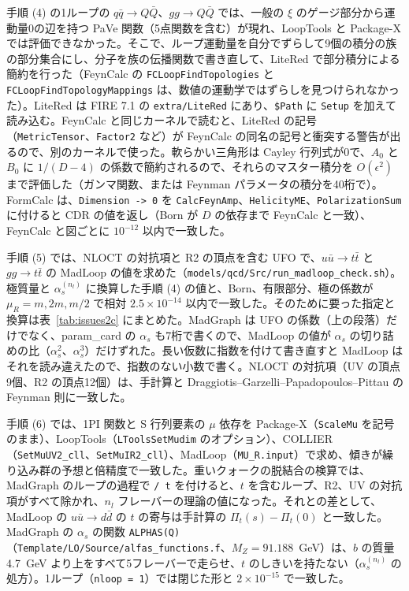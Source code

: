 \documentclass[a4paper,10pt]{ltjsarticle}
\begin{document}
手順 (4) の1ループの $q\bar q\to Q\bar Q$、$gg\to Q\bar Q$ では、一般の $\xi$ のゲージ部分から運動量0の辺を持つ PaVe 関数（5点関数を含む）が現れ、LoopTools と Package-X では評価できなかった。そこで、ループ運動量を自分でずらして9個の積分の族の部分集合にし、分子を族の伝播関数で書き直して、LiteRed で部分積分による簡約を行った（FeynCalc の \texttt{FCLoopFindTopologies} と \texttt{FCLoopFindTopologyMappings} は、数値の運動学ではずらしを見つけられなかった）。LiteRed は FIRE 7.1 の \texttt{extra/LiteRed} にあり、\texttt{\$Path} に \texttt{Setup} を加えて読み込む。FeynCalc と同じカーネルで読むと、LiteRed の記号（\texttt{MetricTensor}、\texttt{Factor2} など）が FeynCalc の同名の記号と衝突する警告が出るので、別のカーネルで使った。軟らかい三角形は Cayley 行列式が0で、$A_0$ と $B_0$ に $1/(D-4)$ の係数で簡約されるので、それらのマスター積分を $O(\epsilon^2)$ まで評価した（ガンマ関数、または Feynman パラメータの積分を40桁で）。FormCalc は、\texttt{Dimension -> 0} を \texttt{CalcFeynAmp}、\texttt{HelicityME}、\texttt{PolarizationSum} に付けると CDR の値を返し（Born が $D$ の依存まで FeynCalc と一致）、FeynCalc と図ごとに $10^{-12}$ 以内で一致した。

手順 (5) では、NLOCT の対抗項と R2 の頂点を含む UFO で、$u\bar u\to t\bar t$ と $gg\to t\bar t$ の MadLoop の値を求めた（\nolinkurl{models/qcd/Src/run_madloop_check.sh}）。極質量と $\alpha_s^{(n_l)}$ に換算した手順 (4) の値と、Born、有限部分、極の係数が $\mu_R=m,2m,m/2$ で相対 $2.5\times10^{-14}$ 以内で一致した。そのために要った指定と換算は表~\ref{tab:issues2c} にまとめた。MadGraph は UFO の係数（上の段落）だけでなく、param\_card の $\alpha_s$ も7桁で書くので、MadLoop の値が $\alpha_s$ の切り詰めの比（$\alpha_s^2$、$\alpha_s^3$）だけずれた。長い仮数に指数を付けて書き直すと MadLoop はそれを読み違えたので、指数のない小数で書く。NLOCT の対抗項（UV の頂点9個、R2 の頂点12個）は、手計算と Draggiotis--Garzelli--Papadopoulos--Pittau の Feynman 則に一致した。

手順 (6) では、1PI 関数と S 行列要素の $\mu$ 依存を Package-X（\texttt{ScaleMu} を記号のまま）、LoopTools（\texttt{LToolsSetMudim} のオプション）、COLLIER（\texttt{SetMuUV2\_cll}、\texttt{SetMuIR2\_cll}）、MadLoop（\texttt{MU\_R.input}）で求め、傾きが繰り込み群の予想と倍精度で一致した。重いクォークの脱結合の検算では、MadGraph のループの過程で \texttt{/ t} を付けると、$t$ を含むループ、R2、UV の対抗項がすべて除かれ、$n_l$ フレーバーの理論の値になった。それとの差として、MadLoop の $u\bar u\to d\bar d$ の $t$ の寄与は手計算の $\Pi_t(s)-\Pi_t(0)$ と一致した。MadGraph の $\alpha_s$ の関数 \texttt{ALPHAS(Q)}（\texttt{Template/LO/Source/alfas\_functions.f}、$M_Z=91.188$~GeV）は、$b$ の質量 4.7~GeV より上をすべて5フレーバーで走らせ、$t$ のしきいを持たない（$\alpha_s^{(n_l)}$ の処方）。1ループ（\texttt{nloop = 1}）では閉じた形と $2\times10^{-15}$ で一致した。
\end{document}
